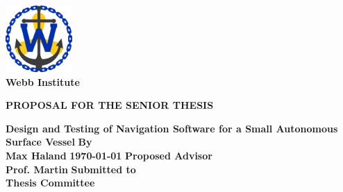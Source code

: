 \begin{titlepage}
	\begin{center}
\begin{singlespacing}
		\includegraphics[width=1.0in]{webblogo}
		\\
		\textbf{Webb Institute}
		\vfill
		\begin{large}
			\textbf{PROPOSAL FOR THE SENIOR THESIS}
		\end{large}
		\vfill
		\textbf{Design and Testing of Navigation Software for a Small Autonomous Surface Vessel}
		\vfill
		\textbf{By\\Max Haland}
		\vfill
		\textbf{\today{}}
		\vfill
		\textbf{Proposed Advisor \\ Prof. Martin}
		\vfill
		\textbf{Submitted to\\Thesis Committee}
\end{singlespacing}
	\end{center}
\end{titlepage}
